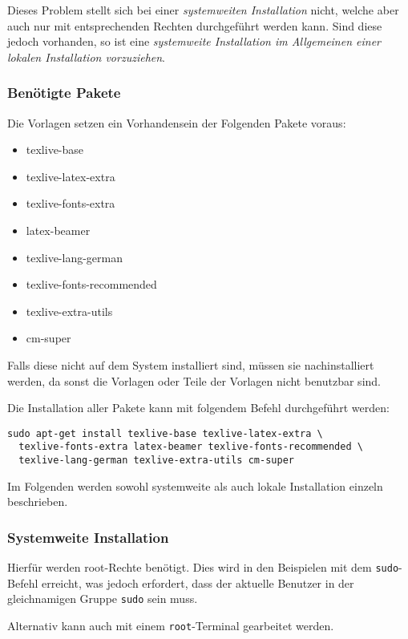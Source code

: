 Dieses Problem stellt sich bei einer \emph{systemweiten Installation} nicht,
welche aber auch nur mit entsprechenden Rechten durchgeführt werden kann.
Sind diese jedoch vorhanden, so ist eine \emph{systemweite Installation im
Allgemeinen einer lokalen Installation vorzuziehen}.

\subsubsection{Benötigte Pakete}

Die Vorlagen setzen ein Vorhandensein der Folgenden Pakete voraus:

\begin{itemize}
  \item texlive-base
  \item texlive-latex-extra
  \item texlive-fonts-extra
  \item latex-beamer
  \item texlive-lang-german
  \item texlive-fonts-recommended
  \item texlive-extra-utils
  \item cm-super
\end{itemize}

Falls diese nicht auf dem System installiert sind, müssen sie nachinstalliert
werden, da sonst die Vorlagen oder Teile der Vorlagen nicht benutzbar sind.

Die Installation aller Pakete kann mit folgendem Befehl durchgeführt werden:
\begin{lstlisting}[style=cmd]
sudo apt-get install texlive-base texlive-latex-extra \
  texlive-fonts-extra latex-beamer texlive-fonts-recommended \
  texlive-lang-german texlive-extra-utils cm-super
\end{lstlisting}

Im Folgenden werden sowohl systemweite als auch lokale Installation einzeln
beschrieben.

\subsubsection{Systemweite Installation}

\begin{important}
  Hierfür werden root-Rechte benötigt. Dies wird in den Beispielen mit
  dem \lstinline{sudo}-Befehl erreicht, was jedoch erfordert, dass der
  aktuelle Benutzer in der gleichnamigen Gruppe \lstinline{sudo} sein muss.\par
  Alternativ kann auch mit einem \lstinline{root}-Terminal gearbeitet
  werden.
\end{important}

